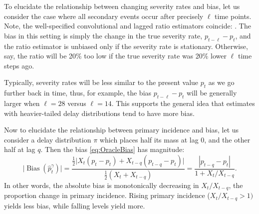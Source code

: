 \documentclass{article}
\renewcommand{\hat}{\widehat} %
\DeclareMathOperator{\bias}{Bias}
\begin{document}
To elucidate the relationship between changing severity rates and bias, let us
consider the case where all secondary events occur after precisely $\ell$ time  
points. Note, the well-specified convolutional and lagged ratio estimators
coincide: \smash{$\hat{p}_t^\gamma = \hat{p}_t^\ell = p_{t-\ell}$}. The bias in
this setting is simply the change in the true severity rate, $p_{t-\ell} - p_t$, 
and the ratio estimator is unbiased only if the severity rate is stationary. 
Otherwise, say, the ratio will be 20\% too low if the true severity rate was
20\% lower $\ell$ time steps ago. 

Typically, severity rates will be less similar to the present value $p_t$ as we
go further back in time, thus, for  example, the bias $p_{t-\ell}-p_t$ will be
generally larger when $\ell=28$ versus $\ell=14$. This supports the general idea
that estimates with heavier-tailed delay distributions tend to have more bias.          

Now to elucidate the relationship between primary incidence and bias, let us 
consider a delay distribution $\pi$ which places half its mass at lag 0, and the
other half at lag $q$. Then the bias \eqref{eq:OracleBias} has magnitude:
\[
\big| \bias(\hat{p}_t^{\gamma}) \big| = \frac{\frac{1}{2} \big| X_t(p_t-p_t) +
  X_{t-q}(p_{t-q}-p_t) \big|} {\frac{1}{2}(X_t+X_{t-q})} = \frac{|p_{t-q}-p_t|}
{1 + X_t / X_{t-q}}. 
\]
In other words, the absolute bias is monotonically decreasing in
$X_t / X_{t-q}$, the proportion change in primary incidence. Rising  
primary incidence ($X_t / X_{t-q} > 1)$ yields less bias, while falling 
levels yield more. 


\end{document}
